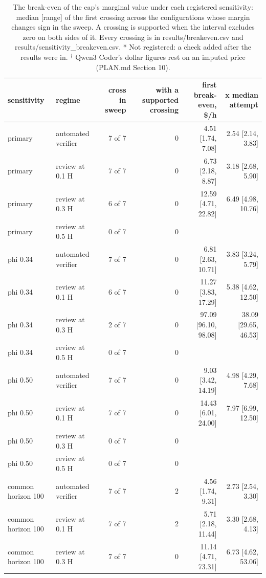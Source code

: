 \begin{table}[t]
\centering
\small
\caption{The break-even of the cap's marginal value under each registered sensitivity: median [range] of the first crossing across the configurations whose margin changes sign in the sweep. A crossing is supported when the interval excludes zero on both sides of it. Every crossing is in results/breakeven.csv and results/sensitivity\_breakeven.csv. * Not registered: a check added after the results were in. $^\dagger$ Qwen3 Coder's dollar figures rest on an imputed price (PLAN.md Section 10).}
\label{tab:tableA1_sensitivity_breakeven}
\begin{tabular}{llrrrr}
\toprule
sensitivity & regime & cross in sweep & with a supported crossing & first break-even, \$/h & x median attempt \\
\midrule
primary & automated verifier & 7 of 7 & 0 & 4.51 [1.74, 7.08] & 2.54 [2.14, 3.83] \\
primary & review at 0.1 H & 7 of 7 & 0 & 6.73 [2.18, 8.87] & 3.18 [2.68, 5.90] \\
primary & review at 0.3 H & 6 of 7 & 0 & 12.59 [4.71, 22.82] & 6.49 [4.98, 10.76] \\
primary & review at 0.5 H & 0 of 7 & 0 &  &  \\
\midrule
phi 0.34 & automated verifier & 7 of 7 & 0 & 6.81 [2.63, 10.71] & 3.83 [3.24, 5.79] \\
phi 0.34 & review at 0.1 H & 6 of 7 & 0 & 11.27 [3.83, 17.29] & 5.38 [4.62, 12.50] \\
phi 0.34 & review at 0.3 H & 2 of 7 & 0 & 97.09 [96.10, 98.08] & 38.09 [29.65, 46.53] \\
phi 0.34 & review at 0.5 H & 0 of 7 & 0 &  &  \\
\midrule
phi 0.50 & automated verifier & 7 of 7 & 0 & 9.03 [3.42, 14.19] & 4.98 [4.29, 7.68] \\
phi 0.50 & review at 0.1 H & 7 of 7 & 0 & 14.43 [6.01, 24.00] & 7.97 [6.99, 12.50] \\
phi 0.50 & review at 0.3 H & 0 of 7 & 0 &  &  \\
phi 0.50 & review at 0.5 H & 0 of 7 & 0 &  &  \\
\midrule
common horizon 100 & automated verifier & 7 of 7 & 2 & 4.56 [1.74, 9.31] & 2.73 [2.54, 3.30] \\
common horizon 100 & review at 0.1 H & 7 of 7 & 2 & 5.71 [2.18, 11.44] & 3.30 [2.68, 4.13] \\
common horizon 100 & review at 0.3 H & 7 of 7 & 0 & 11.14 [4.71, 73.31] & 6.73 [4.62, 53.06] \\

\end{tabular}
\end{table}
